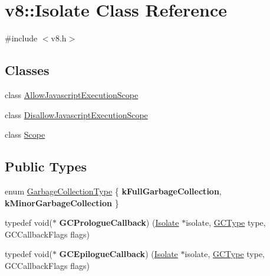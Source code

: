 \hypertarget{classv8_1_1_isolate}{}\section{v8\+:\+:Isolate Class Reference}
\label{classv8_1_1_isolate}


{\ttfamily \#include $<$v8.\+h$>$}

\subsection*{Classes}
\begin{DoxyCompactItemize}
\item 
class \hyperlink{classv8_1_1_isolate_1_1_allow_javascript_execution_scope}{Allow\+Javascript\+Execution\+Scope}
\item 
class \hyperlink{classv8_1_1_isolate_1_1_disallow_javascript_execution_scope}{Disallow\+Javascript\+Execution\+Scope}
\item 
class \hyperlink{classv8_1_1_isolate_1_1_scope}{Scope}
\end{DoxyCompactItemize}
\subsection*{Public Types}
\begin{DoxyCompactItemize}
\item 
enum \hyperlink{classv8_1_1_isolate_a5ae00cc99d8aca148c6f5f9698c432c9}{Garbage\+Collection\+Type} \{ {\bfseries k\+Full\+Garbage\+Collection}, 
{\bfseries k\+Minor\+Garbage\+Collection}
 \}
\item 
\hypertarget{classv8_1_1_isolate_ab14f02c51e012f839e6cc184ede4814a}{}typedef void($\ast$ {\bfseries G\+C\+Prologue\+Callback}) (\hyperlink{classv8_1_1_isolate}{Isolate} $\ast$isolate, \hyperlink{namespacev8_ac109d6f27e0c0f9ef4e98bcf7a806cf2}{G\+C\+Type} type, G\+C\+Callback\+Flags flags)\label{classv8_1_1_isolate_ab14f02c51e012f839e6cc184ede4814a}

\item 
\hypertarget{classv8_1_1_isolate_a3e7351067af07d2a56c57d855fada4bb}{}typedef void($\ast$ {\bfseries G\+C\+Epilogue\+Callback}) (\hyperlink{classv8_1_1_isolate}{Isolate} $\ast$isolate, \hyperlink{namespacev8_ac109d6f27e0c0f9ef4e98bcf7a806cf2}{G\+C\+Type} type, G\+C\+Callback\+Flags flags)\label{classv8_1_1_isolate_a3e7351067af07d2a56c57d855fada4bb}

\end{DoxyCompactItemize}

